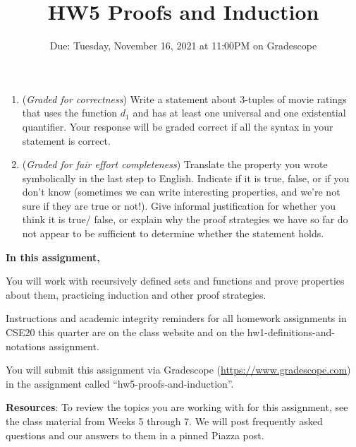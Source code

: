\documentclass[12pt, oneside]{article}
\begin{document}
\begin{enumerate}
\begin{enumerate}
    \item ({\it Graded for correctness}) Write a statement about 3-tuples of movie ratings that uses the function 
    $d_1$ and has at least one universal and one existential quantifier. Your response will be 
    graded correct if all the syntax in your statement is correct.

    \item ({\it Graded for fair effort completeness}) Translate the property you wrote symbolically in the 
    last step to English. Indicate if it is true, false, or if you don't know 
    (sometimes we can write interesting properties, and we're not sure if they are true or not!). 
    Give informal justification for whether  you think it is true/ false, or explain why 
    the proof strategies we have so far do not appear to  be sufficient to determine whether the statement holds.
    \end{enumerate}

\end{enumerate}
\newpage

\title{HW5 Proofs and Induction}
\date{Due: Tuesday, November 16, 2021 at 11:00PM on Gradescope}


\maketitle
\thispagestyle{fancy}

{\bf In this assignment,}

You will work with recursively defined sets and functions and prove 
properties about them, practicing induction and other proof strategies.

Instructions and academic integrity reminders for all homework assignments in 
CSE20 this quarter are on the class website and on the hw1-definitions-and-notations
assignment.

You will submit this assignment via Gradescope
(\href{https://www.gradescope.com}{https://www.gradescope.com}) 
in the assignment called ``hw5-proofs-and-induction''.

{\bf Resources}: To review the topics you are working with 
for this assignment, see the class material from Weeks 5 through 7.
We will post frequently asked questions and our answers to them in a 
pinned Piazza post.
\end{document}

